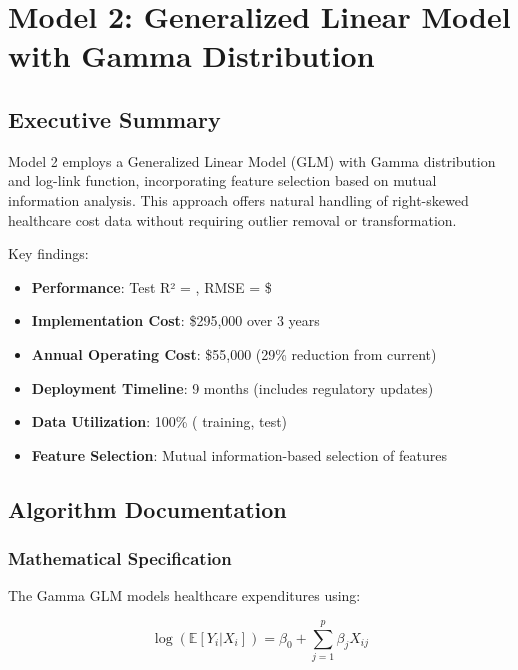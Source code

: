 \chapter{Model 2: Generalized Linear Model with Gamma Distribution}\label{ch:model2}



\section{Executive Summary}

Model 2 employs a Generalized Linear Model (GLM) with Gamma distribution and log-link function, incorporating feature selection based on mutual information analysis. This approach offers natural handling of right-skewed healthcare cost data without requiring outlier removal or transformation.

Key findings:
\begin{itemize}
    \item \textbf{Performance}: Test R² = \ModelTwoRSquaredTest{}, RMSE = \$\ModelTwoRMSETest{}
    \item \textbf{Implementation Cost}: \$295,000 over 3 years
    \item \textbf{Annual Operating Cost}: \$55,000 (29\% reduction from current)
    \item \textbf{Deployment Timeline}: 9 months (includes regulatory updates)
    \item \textbf{Data Utilization}: 100\% (\ModelTwoTrainingSamples{} training, \ModelTwoTestSamples{} test)
    \item \textbf{Feature Selection}: Mutual information-based selection of \ModelTwoNumFeatures{} features
\end{itemize}

\section{Algorithm Documentation}

\subsection{Mathematical Specification}

The Gamma GLM models healthcare expenditures using:

\begin{equation}
\log(\mathbb{E}[Y_i | X_i]) = \beta_0 + \sum_{j=1}^{p} \beta_j X_{ij}
\end{equation}


